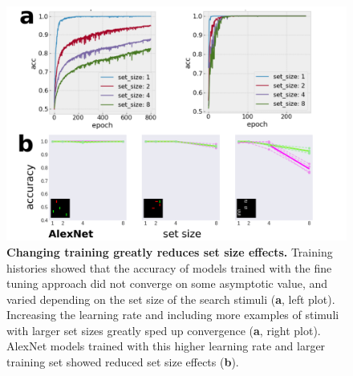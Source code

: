\documentclass[10pt,letterpaper]{article}
\begin{document}
\begin{figure}[ht]
\begin{center}
\includegraphics[width=\columnwidth]{fig3/fig3.png}
\end{center}
\caption{
\textbf{Changing training greatly reduces set size effects.}
Training histories showed that the accuracy of models trained 
with the fine tuning approach did not converge
on some asymptotic value, and 
varied depending on the set size of the search stimuli (\textbf{a}, left plot). 
Increasing the learning rate and including more examples of stimuli with 
larger set sizes greatly sped up convergence (\textbf{a}, right plot).
AlexNet models trained with this higher learning rate and larger training set
showed reduced set size effects (\textbf{b}).
} 
\label{fig3}
\end{figure}
\end{document}
